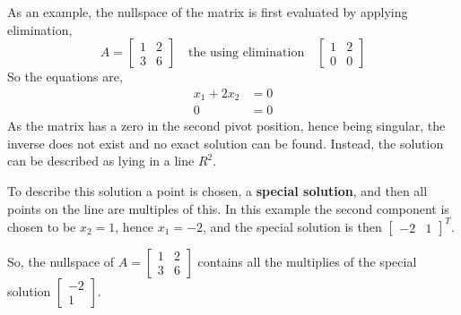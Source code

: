             \par \hfill \break
            As an example, the nullspace of the matrix is first evaluated by applying elimination,
            \begin{equation}
                A = 
                \begin{bmatrix}
                    1 & 2 \\
                    3 & 6
                \end{bmatrix}
                \quad \textrm{the using elimination} \quad
                \begin{bmatrix}
                    1 & 2 \\
                    0 & 0
                \end{bmatrix}
            \end{equation}
            So the equations are,
            \begin{equation}
                \begin{aligned}
                    x_1 + 2x_2 &= 0 \\
                    0 &= 0
                \end{aligned}
            \end{equation}
            As the matrix has a zero in the second pivot position, hence being singular, the inverse does not exist and
            no exact solution can be found. Instead, the solution can be described as lying in a line \(R^2\).

            \par \hfill \break
            To describe this solution a point is chosen, a \textbf{special solution}, and then all points on the line 
            are multiples of this. In this example the second component is chosen to be \(x_2=1\), hence \(x_1=-2\), 
            and the special solution is then \(\begin{bmatrix} -2 & 1 \end{bmatrix}^T\).

            \par \hfill \break
            So, the nullspace of \(A = \begin{bmatrix} 1 & 2 \\ 3 & 6\end{bmatrix}\) contains all the multiplies of
            the special solution \(\begin{bmatrix} -2 \\ 1 \end{bmatrix}\).


